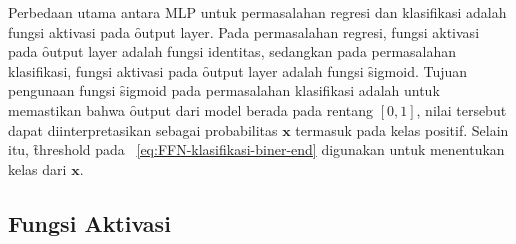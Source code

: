     Perbedaan utama antara MLP untuk permasalahan regresi dan klasifikasi adalah fungsi aktivasi pada \f{output layer}. Pada permasalahan regresi, fungsi aktivasi pada \f{output layer} adalah fungsi identitas, sedangkan pada permasalahan klasifikasi, fungsi aktivasi pada \f{output layer} adalah fungsi \f{sigmoid}. Tujuan pengunaan fungsi \f{sigmoid} pada permasalahan klasifikasi adalah untuk memastikan bahwa \f{output} dari model berada pada rentang $[0, 1]$, nilai tersebut dapat diinterpretasikan sebagai probabilitas $\mathbf{x}$ termasuk pada kelas positif. Selain itu, \f{threshold} pada \equ~\ref{eq:FFN-klasifikasi-biner-end} digunakan untuk menentukan kelas dari $\mathbf{x}$.

    \subsection{Fungsi Aktivasi}

